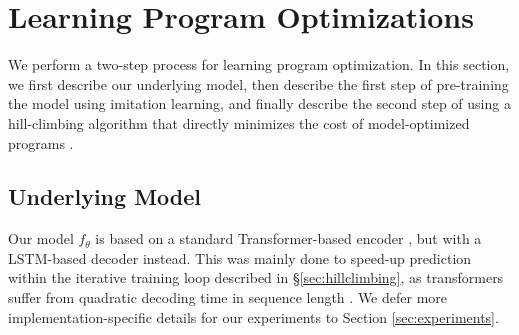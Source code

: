 \documentclass{article}
\begin{document}
\section{Learning Program Optimizations}
\label{sec:learning}


We perform a two-step process for learning program optimization.
In this section, we first describe our underlying model, then describe the first step of pre-training the model using imitation learning, and finally describe the second step of using a hill-climbing algorithm that directly minimizes the cost of model-optimized programs .

\subsection{Underlying Model}

 

Our model $f_{\theta}$ is based on a standard Transformer-based encoder \citep{vaswani2017attention}, but with a LSTM-based decoder \citep{hochreiter1997long,chen-etal-2018-best} instead.
This was mainly done to speed-up prediction within the iterative training loop described in \S\ref{sec:hillclimbing}, as transformers suffer from quadratic decoding time in sequence length \citep{chen-etal-2018-best}. We defer more implementation-specific details for our experiments to Section \ref{sec:experiments}. 
\end{document}

